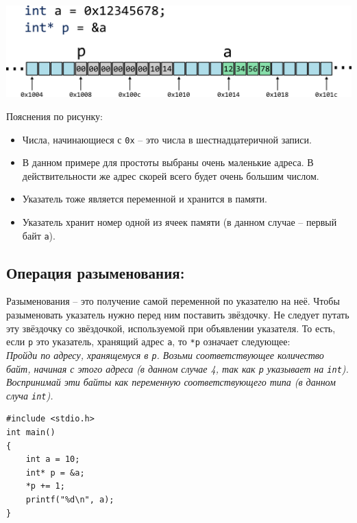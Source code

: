 \documentclass{article}
\begin{document}
\begin{center}
\includegraphics[scale=1]{../images/memory_3_pointer_to_int_b.png}
\end{center}
Пояснения по рисунку:
\begin{itemize}
\item Числа, начинающиеся с \texttt{0x} -- это числа в шестнадцатеричной записи.
\item В данном примере для простоты выбраны очень маленькие адреса. В действительности же адрес скорей всего будет очень большим числом.
\item Указатель тоже является переменной и хранится в памяти.
\item Указатель хранит номер одной из ячеек памяти (в данном случае -- первый байт \texttt{a}).
\end{itemize}

\subsection*{Операция разыменования:}
Разыменования -- это получение самой переменной по указателю на неё. Чтобы разыменовать указатель нужно перед ним поставить звёздочку. Не следует путать эту звёздочку со звёздочкой, используемой при объявлении указателя. То есть, если \texttt{p} это указатель, хранящий адрес \texttt{a}, то \texttt{*p} означает следующее:\\

\textit{Пройди по адресу, хранящемуся в \texttt{p}. Возьми соответствующее количество байт, начиная с этого адреса (в данном случае 4, так как \texttt{p} указывает на \texttt{int}). Воспринимай эти байты как переменную соответствующего типа (в данном случа \texttt{int}).}

\begin{lstlisting}
#include <stdio.h>
int main() 
{
    int a = 10;
    int* p = &a;
    *p += 1;
    printf("%d\n", a);
}
\end{lstlisting}

\newpage
\end{document}
